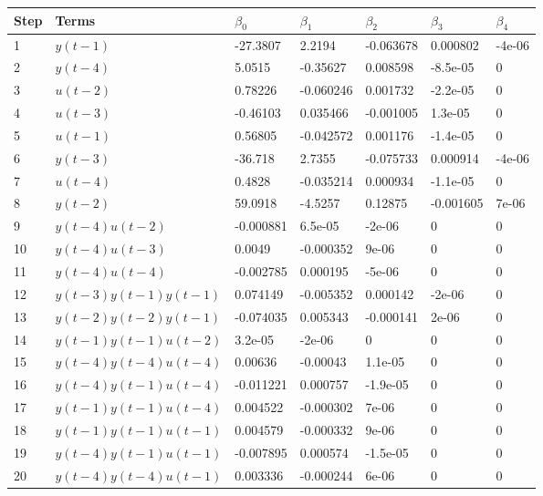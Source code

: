 \begin{tabular}{lllllll}
Step & Terms & $\beta_{0}$ & $\beta_{1}$ & $\beta_{2}$ & $\beta_{3}$ & $\beta_{4}$ \\ 
\hline 
1 & $y(t-1)$ & -27.3807 & 2.2194 & -0.063678 & 0.000802 & -4e-06 \\ 
2 & $y(t-4)$ & 5.0515 & -0.35627 & 0.008598 & -8.5e-05 & 0 \\ 
3 & $u(t-2)$ & 0.78226 & -0.060246 & 0.001732 & -2.2e-05 & 0 \\ 
4 & $u(t-3)$ & -0.46103 & 0.035466 & -0.001005 & 1.3e-05 & 0 \\ 
5 & $u(t-1)$ & 0.56805 & -0.042572 & 0.001176 & -1.4e-05 & 0 \\ 
6 & $y(t-3)$ & -36.718 & 2.7355 & -0.075733 & 0.000914 & -4e-06 \\ 
7 & $u(t-4)$ & 0.4828 & -0.035214 & 0.000934 & -1.1e-05 & 0 \\ 
8 & $y(t-2)$ & 59.0918 & -4.5257 & 0.12875 & -0.001605 & 7e-06 \\ 
9 & $y(t-4)u(t-2)$ & -0.000881 & 6.5e-05 & -2e-06 & 0 & 0 \\ 
10 & $y(t-4)u(t-3)$ & 0.0049 & -0.000352 & 9e-06 & 0 & 0 \\ 
11 & $y(t-4)u(t-4)$ & -0.002785 & 0.000195 & -5e-06 & 0 & 0 \\ 
12 & $y(t-3)y(t-1)y(t-1)$ & 0.074149 & -0.005352 & 0.000142 & -2e-06 & 0 \\ 
13 & $y(t-2)y(t-2)y(t-1)$ & -0.074035 & 0.005343 & -0.000141 & 2e-06 & 0 \\ 
14 & $y(t-1)y(t-1)u(t-2)$ & 3.2e-05 & -2e-06 & 0 & 0 & 0 \\ 
15 & $y(t-4)y(t-4)u(t-4)$ & 0.00636 & -0.00043 & 1.1e-05 & 0 & 0 \\ 
16 & $y(t-4)y(t-1)u(t-4)$ & -0.011221 & 0.000757 & -1.9e-05 & 0 & 0 \\ 
17 & $y(t-1)y(t-1)u(t-4)$ & 0.004522 & -0.000302 & 7e-06 & 0 & 0 \\ 
18 & $y(t-1)y(t-1)u(t-1)$ & 0.004579 & -0.000332 & 9e-06 & 0 & 0 \\ 
19 & $y(t-4)y(t-1)u(t-1)$ & -0.007895 & 0.000574 & -1.5e-05 & 0 & 0 \\ 
20 & $y(t-4)y(t-4)u(t-1)$ & 0.003336 & -0.000244 & 6e-06 & 0 & 0 \\ 
\hline 
\end{tabular}